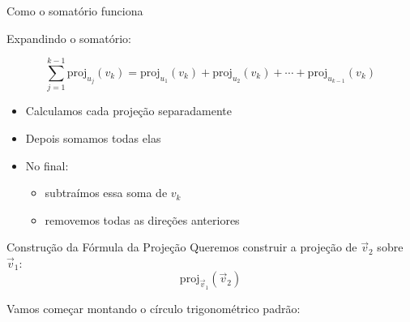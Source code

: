 \documentclass{beamer}
\begin{document}
\begin{frame}{Como o somatório funciona}


\vspace{0.5cm}

Expandindo o somatório:

\[
\sum_{j=1}^{k-1} \mathrm{proj}_{u_j}(v_k)
=
\mathrm{proj}_{u_1}(v_k)
+
\mathrm{proj}_{u_2}(v_k)
+
\cdots
+
\mathrm{proj}_{u_{k-1}}(v_k)
\]

\vspace{0.5cm}

\begin{itemize}
    \item Calculamos cada projeção separadamente
    \item Depois somamos todas elas
\end{itemize}

\vspace{0.5cm}

\begin{itemize}
    \item No final:
    \begin{itemize}
        \item subtraímos essa soma de $v_k$
        \item removemos todas as direções anteriores
    \end{itemize}
\end{itemize}

\end{frame}
\begin{frame}{Construção da Fórmula da Projeção}
Queremos construir a projeção de $\vec{v}_2$ sobre $\vec{v}_1$:
\[
\mathrm{proj}_{\vec{v}_1}(\vec{v}_2)
\]

Vamos começar montando o círculo trigonométrico padrão: 
\end{frame}
\end{document}
